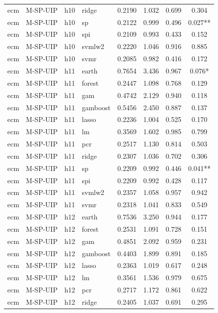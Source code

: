\begin{ThreePartTable}
\begin{longtable}[t]{llclcccc}
ecm & M-SP-UIP & h10 & ridge & 0.2190 & 1.032 & 0.699 & 0.304\\
ecm & M-SP-UIP & h10 & sp & 0.2122 & 0.999 & 0.496 & 0.027**\\
ecm & M-SP-UIP & h10 & spi & 0.2109 & 0.993 & 0.433 & 0.152\\
ecm & M-SP-UIP & h10 & svmlw2 & 0.2220 & 1.046 & 0.916 & 0.885\\
ecm & M-SP-UIP & h10 & svmr & 0.2085 & 0.982 & 0.416 & 0.172\\
\addlinespace
ecm & M-SP-UIP & h11 & earth & 0.7654 & 3.436 & 0.967 & 0.076*\\
ecm & M-SP-UIP & h11 & forest & 0.2447 & 1.098 & 0.768 & 0.129\\
ecm & M-SP-UIP & h11 & gam & 0.4742 & 2.129 & 0.940 & 0.118\\
ecm & M-SP-UIP & h11 & gamboost & 0.5456 & 2.450 & 0.887 & 0.137\\
ecm & M-SP-UIP & h11 & lasso & 0.2236 & 1.004 & 0.525 & 0.170\\
ecm & M-SP-UIP & h11 & lm & 0.3569 & 1.602 & 0.985 & 0.799\\
ecm & M-SP-UIP & h11 & pcr & 0.2517 & 1.130 & 0.814 & 0.503\\
ecm & M-SP-UIP & h11 & ridge & 0.2307 & 1.036 & 0.702 & 0.306\\
ecm & M-SP-UIP & h11 & sp & 0.2209 & 0.992 & 0.446 & 0.041**\\
ecm & M-SP-UIP & h11 & spi & 0.2209 & 0.992 & 0.428 & 0.117\\
ecm & M-SP-UIP & h11 & svmlw2 & 0.2357 & 1.058 & 0.957 & 0.942\\
ecm & M-SP-UIP & h11 & svmr & 0.2318 & 1.041 & 0.833 & 0.549\\
\addlinespace
ecm & M-SP-UIP & h12 & earth & 0.7536 & 3.250 & 0.944 & 0.177\\
ecm & M-SP-UIP & h12 & forest & 0.2531 & 1.091 & 0.728 & 0.151\\
ecm & M-SP-UIP & h12 & gam & 0.4851 & 2.092 & 0.959 & 0.231\\
ecm & M-SP-UIP & h12 & gamboost & 0.4403 & 1.899 & 0.891 & 0.185\\
ecm & M-SP-UIP & h12 & lasso & 0.2363 & 1.019 & 0.617 & 0.248\\
ecm & M-SP-UIP & h12 & lm & 0.3561 & 1.536 & 0.979 & 0.675\\
ecm & M-SP-UIP & h12 & pcr & 0.2717 & 1.172 & 0.861 & 0.622\\
ecm & M-SP-UIP & h12 & ridge & 0.2405 & 1.037 & 0.691 & 0.295\\

\end{longtable}
\end{ThreePartTable}
